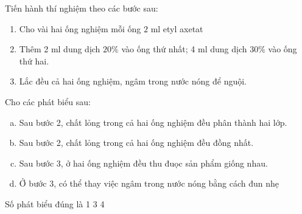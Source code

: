 \begin{ex}
	Tiến hành thí nghiệm theo các bước sau:
		\begin{enumerate}[label=\bfseries Bước \arabic*:,wide=0cm,leftmargin=0cm]
			\item Cho vài hai ống nghiệm mỗi ống $ 2 $ ml etyl axetat
			\item Thêm 2 ml dung dịch  $ 20\% $ vào ống thứ nhất; 4 ml dung dịch  $ 30\% $ vào ống thứ hai.
			\item Lắc đều cả hai ống nghiệm, ngâm trong nước nóng để nguội.
		\end{enumerate}
	Cho các phát biểu sau:
	\begin{enumerate}[(a)]
		\item Sau bước 2, chất lỏng trong cả hai ống nghiệm đều phân thành hai lớp.
		\item Sau bước 2, chất lỏng trong cả hai ống nghiệm đều đồng nhất.
		\item Sau bước 3, ở hai ống nghiệm đều thu đuọc sản phẩm giống nhau.
		\item Ở bước 3, có thể thay việc ngâm trong nước nóng bằng cách đun nhẹ
	\end{enumerate}
Số phát biểu đúng là
	\choice
	{%
		1
	}
 {%
 	3
 }
{%
	4
}
{%
}
	
\end{ex}




%

